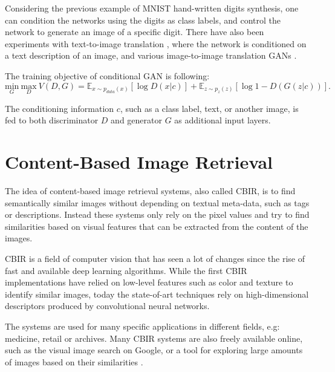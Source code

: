 \documentclass[12pt]{report}
\begin{document}
Considering the previous example of MNIST hand-written digits synthesis, one can condition the networks using the digits as class labels, and control the network to generate an image of a specific digit. There have also been experiments with text-to-image translation \cite{reed_generative_2016}, where the network is conditioned on a text description of an image, and various image-to-image translation GANs \cite{yoo_pixel-level_2016}\cite{yoo_pixel-level_2016}\cite{pathak_context_2016}.

The training objective of conditional GAN is following:
\begin{equation}
\underset{G}{\mathrm{min}} \ \underset{D}{\mathrm{max}} \ V(D,G) = \mathbb{E}_{x \sim p_{data}(x)}[\log D(x|c)] + \mathbb{E}_{z \sim p_{z}(z)}[\log 1 - D(G(z|c))].
\label{eq:cgan}
\end{equation}

The conditioning information $c$, such as a class label, text, or another image, is fed to both discriminator $D$ and generator $G$ as additional input layers.









\pagebreak
\section{Content-Based Image Retrieval}
The idea of content-based image retrieval systems, also called CBIR, is to find semantically similar images without depending on textual meta-data, such as tags or descriptions. Instead these systems only rely on the pixel values and try to find similarities based on visual features that can be extracted from the content of the images.

CBIR is a field of computer vision that has seen a lot of changes since the rise of fast and available deep learning algorithms. While the first CBIR implementations have relied on low-level features such as color and texture to identify similar images, today the state-of-art techniques rely on high-dimensional descriptors produced by convolutional neural networks.

The systems are used for many specific applications in different fields, e.g: medicine, retail or archives. Many CBIR systems are also freely available online, such as the visual image search on Google, or a tool for exploring large amounts of images based on their similarities \cite{Barthel:2017:VBM:3078971.3079016}.
\end{document}
